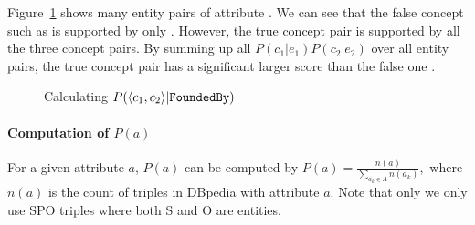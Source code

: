 {\footnotesize
\begin{example}
\label{exa:pggga}
Figure~\ref{fig:bipartite} shows many entity pairs of attribute . 
We can see that the false concept such as  is supported by only .
However, the true concept pair  is supported by all the three concept pairs. 
By summing up all $P(c_1|e_1)P(c_2|e_2) $ over all entity pairs, the true concept pair  has a significant larger score than the false one .
\end{example}
}


\begin{figure}[!htb]
\vspace{-6mm}
\centering
{}
\vspace{-8mm}
\caption{Calculating $P(  \langle {c}_{1},{c}_{2} \rangle  | {\tt FoundedBy} )$ }
\label{fig:bipartite}
\vspace{-3mm}
\end{figure}

\paragraph{Computation of $P(a)$}
For a given attribute $a$, $P(a)$ can be computed by
$
P(a)=\frac{n(a)}{\sum_{a_k\in A}{n(a_k)}},
$
where $n(a)$ is the count of triples in DBpedia with attribute $a$.
Note that only we only use SPO triples where both S and O are entities.


%
%
%






